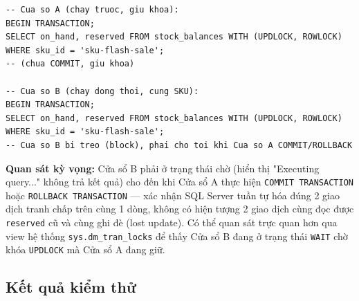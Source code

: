 \begin{lstlisting}
-- Cua so A (chay truoc, giu khoa):
BEGIN TRANSACTION;
SELECT on_hand, reserved FROM stock_balances WITH (UPDLOCK, ROWLOCK)
WHERE sku_id = 'sku-flash-sale';
-- (chua COMMIT, giu khoa)

-- Cua so B (chay dong thoi, cung SKU):
BEGIN TRANSACTION;
SELECT on_hand, reserved FROM stock_balances WITH (UPDLOCK, ROWLOCK)
WHERE sku_id = 'sku-flash-sale';
-- Cua so B bi treo (block), phai cho toi khi Cua so A COMMIT/ROLLBACK
\end{lstlisting}

\textbf{Quan sát kỳ vọng:} Cửa sổ B phải ở trạng thái chờ (hiển thị "Executing query..." không trả kết quả) cho đến khi Cửa sổ A thực hiện \texttt{COMMIT TRANSACTION} hoặc \texttt{ROLLBACK TRANSACTION} — xác nhận SQL Server tuần tự hóa đúng 2 giao dịch tranh chấp trên cùng 1 dòng, không có hiện tượng 2 giao dịch cùng đọc được \texttt{reserved} cũ và cùng ghi đè (lost update). Có thể quan sát trực quan hơn qua view hệ thống \texttt{sys.dm\_tran\_locks} để thấy Cửa sổ B đang ở trạng thái \texttt{WAIT} chờ khóa \texttt{UPDLOCK} mà Cửa sổ A đang giữ.

\subsection{Kết quả kiểm thử}
\label{sec:test-results}

